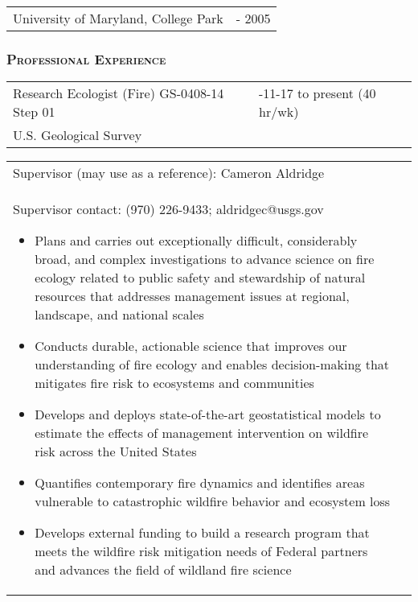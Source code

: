 \documentclass[10pt,english]{article}
\providecommand{\tabularnewline}{\\}
\begin{document}
\begin{tabularx}{\textwidth}{@{}>{\raggedright}p{5.25in} >{\raggedleft}X@{}}
University of Maryland, College Park & 2003 - 2005 \tabularnewline
\end{tabularx}


\subsubsection*{\textsc{Professional Experience}}
\vspace{-0.5ex}

\linespread{1.1}

\renewcommand{\arraystretch}{1.2}
\begin{tabularx}{\textwidth}{@{}>{\raggedright}p{3.75in} >{\raggedleft}X@{}}
Research Ecologist (Fire) GS-0408-14 Step 01 & 2024-11-17 to present (40 hr/wk) \tabularnewline
U.S. Geological Survey & \tabularnewline
\end{tabularx}

\renewcommand{\arraystretch}{1.2}
\begin{tabularx}{\textwidth}{@{}>{\raggedright}p{6.25in} >{\raggedleft}X@{}}
\addtolength{\leftskip}{5ex}Supervisor (may use as a reference): Cameron Aldridge \tabularnewline
\addtolength{\leftskip}{5ex}Supervisor contact: (970) 226-9433; aldridgec@usgs.gov
\begin{itemize}
\itemsep0em
\item{Plans and carries out exceptionally difficult, considerably broad, and complex investigations to advance science on fire ecology related to public safety and stewardship of natural resources that addresses management issues at regional, landscape, and national scales}
\item{Conducts durable, actionable science that improves our understanding of fire ecology and enables decision-making that mitigates fire risk to ecosystems and communities}
\item{Develops and deploys state-of-the-art geostatistical models to estimate the effects of management intervention on wildfire risk across the United States}
\item{Quantifies contemporary fire dynamics and identifies areas vulnerable to catastrophic wildfire behavior and ecosystem loss}
\item{Develops external funding to build a research program that meets the wildfire risk mitigation needs of Federal partners and advances the field of wildland fire science}
\end{itemize}
\end{tabularx}
\end{document}
